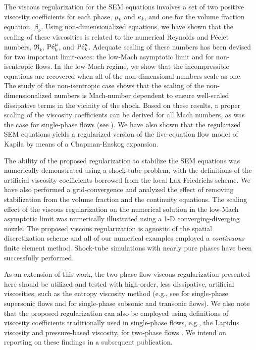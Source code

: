 The viscous regularization for the SEM equations involves a set of two positive viscosity coefficients for each phase, $\mu_k$ and $\kappa_k$, and one for the volume 
fraction equation, $\beta_k$. Using non-dimensionalized equations, we have shown that the scaling of these viscosities is related to the numerical Reynolds 
and P\'eclet numbers, $\Re_k$, $\textrm{P\'e}_k^\mu$, and $\textrm{P\'e}_k^\kappa$. 
Adequate scaling of these numbers has been devised for two important limit-cases: the low-Mach asymptotic limit and for non-isentropic flows. In the low-Mach regime, 
we show that the incompressible equations are recovered when all of the non-dimensional numbers scale as one. The study of the non-isentropic case 
shows that the scaling of the non-dimensionalized numbers is Mach-number dependent to ensure well-scaled dissipative terms in the vicinity of the shock.
Based on these results, a proper scaling of the viscosity coefficients can be derived for all Mach numbers, as was the case for single-phase flows (see \cite{Marco_paper_low_mach}). 
%
We have also shown that the regularized SEM equations yields a regularized version of the five-equation flow model of Kapila by means of a Chapman-Enskog expansion.

The ability of the proposed regularization to stabilize the SEM equations was numerically demonstrated using a shock tube problem, with the definitions of the 
artificial viscosity coefficients borrowed from the local Lax-Friedrichs scheme. We have also performed a grid-convergence and analyzed the effect of removing 
stabilization from the volume fraction and the continuity equations. The scaling effect of the viscous regularization on the numerical solution in the low-Mach 
asymptotic limit was numerically illustrated using a 1-D converging-diverging nozzle. The proposed viscous regularization is agnostic of the spatial discretization
scheme and all of our numerical examples employed a {\it continuous} finite element method.
Shock-tube simulations with nearly pure phases have been successfully performed. 

As an extension of this work, the two-phase flow viscous regularization presented here should be utilized and tested with high-order, less dissipative, artificial viscosities, 
such as the entropy viscosity method (e.g., see \cite{jlg_EVM_JCP2011} for single-phase supersonic flows and \cite{Marco_paper_low_mach} for single-phase subsonic and transonic flows). 
We also note that the proposed regularization can also be employed using definitions of viscosity coefficients traditionally used in single-phase flows, e.g., 
the Lapidus viscosity \cite{Lapidus_paper,Lapidus_book} and pressure-based viscosity, for two-phase flows \cite{PBV_book}. We intend on reporting on these findings in 
a subsequent publication. 
%

